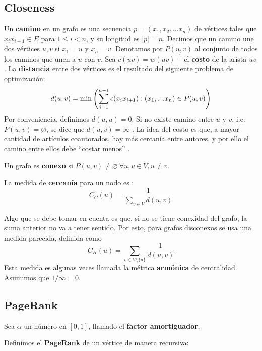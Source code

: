 \documentclass[journal]{IEEEtran}
\newcommand\mydots{\hbox to 1em{.\hss.\hss.}}
\begin{document}
\subsection{Closeness}
Un \textbf{camino} en un grafo es una secuencia \(p = (x_1, x_2, \ldots x_n)\) de vértices tales que \(x_{i}x_{i+1} \in E\) para \(1 \leq i < n\), y su longitud es \(|p| = n\). Decimos que un camino une dos vértices \(u, v\) si \(x_1 = u\) y \(x_n = v\). Denotamos por \(P(u, v)\) al conjunto de todos los caminos que unen a \(u\) con \(v\). Sea \(c(uv) = w(uv)^{-1}\) el \textbf{costo} de la arista \(uv\). La \textbf{distancia} entre dos vértices es el resultado del siguiente problema de optimización:
\begin{equation} \label{eq:distance}
d(u, v) = \min \left(\sum_{i=1}^{n-1} c(x_{i}x_{i+1}) : (x_1, \mydots x_n) \in P(u, v)\right)
\end{equation}
Por conveniencia, definimos \(d(u, u) = 0\). Si no existe camino entre \(u\) y \(v\), i.e. \(P(u, v) = \varnothing\), se dice que \(d(u, v) = \infty\) \cite{bollobas}. La idea del costo es que, a mayor cantidad de artículos coautorados, hay más cercanía entre autores, y por ello el camino entre ellos debe ``costar menos'' \cite{newman}.

Un grafo es \textbf{conexo} si \(P(u, v) \neq \varnothing~\forall u, v \in V, u \neq v\).

La medida de \textbf{cercanía} para un nodo es \cite{brandes}:
\begin{equation} \label{eq:close}
C_C (u) = \frac{1}{\sum_{v \in V} d(u, v)}
\end{equation}

Algo que se debe tomar en cuenta es que, si no se tiene conexidad del grafo, la suma anterior no va a tener sentido. Por esto, para grafos disconexos se usa una medida parecida, definida como
\begin{equation}
C_H (u) = \sum_{v \in V \setminus \{u\}} \frac{1}{d(u, v)}
\end{equation}
Esta medida es algunas veces llamada la métrica \textbf{armónica} de centralidad\cite{rochat}. Asumimos que \(1/\infty = 0\).
\subsection{PageRank}
Sea \(\alpha\) un número en \([0, 1]\), llamado el \textbf{factor amortiguador}.

Definimos el \textbf{PageRank} de un vértice de manera recursiva:
\end{document}
